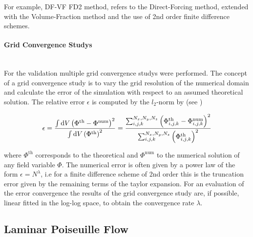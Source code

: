 For example, DF-VF FD2 method, refers to the Direct-Forcing method, extended with the Volume-Fraction
method and the use of 2nd order finite difference schemes.

\paragraph{Grid Convergence Studys}\mbox{}\\

For the validation multiple grid convergence studys were performed.
The concept of a grid convergence study is to vary the grid resolution of the numerical domain and
calculate the error of the simulation with respect to an assumed theoretical solution.
The relative error $\epsilon$ is computed by the $l_2$-norm by (see \citep{QUELLE})

\begin{align}
    \epsilon = \frac{\int \mathop{}\!\mathrm{d} V \left(\Phi^{\text{th}} - \Phi^{\text{num}}\right)^2}{\int \mathop{}\!\mathrm{d} V \left( \Phi^{\text{th}} \right)^2}
     = \frac{\sum_{i,j,k}^{N_x, N_y, N_z}
      \left(\Phi^{\text{th}}_{i,j,k}  - \Phi^{\text{num}}_{i, j, k}  \right)^2}
     {\sum_{i,j,k}^{N_x, N_y, N_z} \left( \Phi^{\text{th}}_{i,j,k} \right)^2}
 \end{align}

where $\Phi^{\text{th}}$ corresponds to the theoretical and $\Phi^{\text{num}}$ to the numerical solution of any field variable $\Phi$.
The numerical error is often given by a power law of the form $\epsilon = N^\lambda$, i.e for a finite difference scheme of 2nd order
this is the truncation error given by the remaining terms  of the taylor expansion.
For an evaluation of the error convergence the results of the grid convergence study are, if possible, linear fitted in the log-log space, to obtain the
convergence rate $\lambda$.

\clearpage

\subsection{Laminar Poiseuille Flow}
\label{vali:sec_lpflow_setup}

